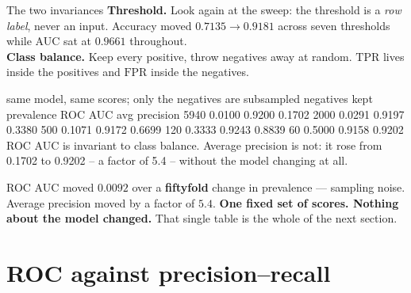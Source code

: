 \documentclass[aspectratio=169]{beamer}
\newcommand{\TPR}{\mathrm{TPR}}
\newcommand{\FPR}{\mathrm{FPR}}
\begin{document}
\begin{frame}[fragile,shrink=8]{The two invariances}
\textbf{Threshold.} Look again at the sweep: the threshold is a \emph{row
label}, never an input. Accuracy moved $0.7135 \to 0.9181$ across seven
thresholds while AUC sat at $0.9661$ throughout.\\[0.2em]
\textbf{Class balance.} Keep every positive, throw negatives away at random.
$\TPR$ lives inside the positives and $\FPR$ inside the negatives.
\begin{outblk}
same model, same scores; only the negatives are subsampled
 negatives kept  prevalence   ROC AUC   avg precision
           5940      0.0100    0.9200       0.1702
           2000      0.0291    0.9197       0.3380
            500      0.1071    0.9172       0.6699
            120      0.3333    0.9243       0.8839
             60      0.5000    0.9158       0.9202
ROC AUC is invariant to class balance. Average precision is not:
  it rose from 0.1702 to 0.9202 -- a factor of 5.4 -- without the model
  changing at all.
\end{outblk}
\begin{center}\small
  ROC AUC moved $0.0092$ over a \textbf{fiftyfold} change in prevalence ---
  sampling noise. Average precision moved by a factor of $\mathbf{5.4}$.
  \textbf{One fixed set of scores. Nothing about the model changed.} That
  single table is the whole of the next section.
\end{center}
\end{frame}

\section[ROC/PR]{ROC against precision--recall}
\label{sec:rocpr}
\end{document}
